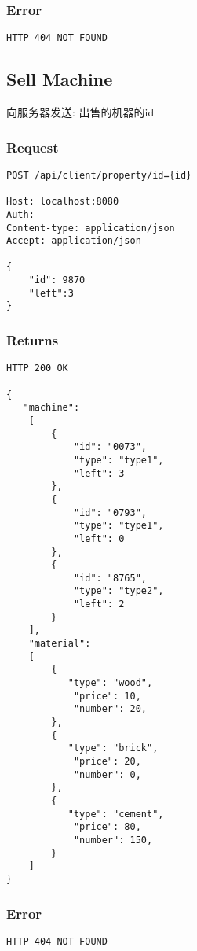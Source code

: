 \documentclass{article}
\begin{document}
\subsubsection*{Error}
\begin{lstlisting}
HTTP 404 NOT FOUND
\end{lstlisting}









\subsection{Sell Machine}
向服务器发送: 出售的机器的id
\subsubsection*{Request}
\begin{lstlisting}
POST /api/client/property/id={id}

Host: localhost:8080
Auth:
Content-type: application/json
Accept: application/json

{
	"id": 9870
	"left":3
}
\end{lstlisting}
\subsubsection*{Returns}
\begin{lstlisting}
HTTP 200 OK

{
   "machine":
    [
        {
            "id": "0073",
            "type": "type1",
            "left": 3
        },
        {
            "id": "0793",
            "type": "type1",
            "left": 0
        },
        {
            "id": "8765",
            "type": "type2",
            "left": 2
        }
    ],
    "material":
    [
        {
       	   "type": "wood",
            "price": 10,
            "number": 20,
        },
        {
       	   "type": "brick",
            "price": 20,
            "number": 0,
        },
        {
       	   "type": "cement",
            "price": 80,
            "number": 150,
        }
    ]
}
\end{lstlisting}
\subsubsection*{Error}
\begin{lstlisting}
HTTP 404 NOT FOUND
\end{lstlisting}
\end{document}
